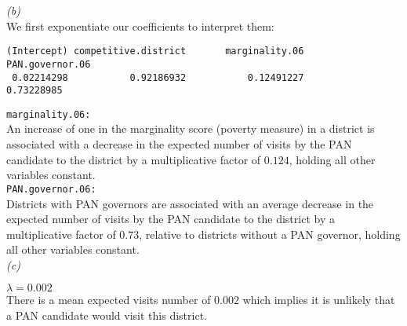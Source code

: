 \documentclass[12pt,letterpaper]{article}
\begin{document}
\newpage
\noindent\textit{(b)}\\
\noindent We first exponentiate our coefficients to interpret them:

\begin{BVerbatim}
(Intercept) competitive.district       marginality.06      PAN.governor.06
 0.02214298           0.92186932           0.12491227           0.73228985 
\end{BVerbatim}

\vspace{0.75cm}
\noindent \texttt{marginality.06:}\\
\noindent An increase of one in the marginality score (poverty measure) in a district is associated with a decrease in the expected number of visits by the PAN candidate to the district by a multiplicative factor of $0.124$, holding all other variables constant.\\

\noindent \texttt{PAN.governor.06:}\\
\noindent Districts with PAN governors are associated with an average decrease in the expected number of visits by the PAN candidate to the district by a multiplicative factor of $0.73$, relative to districts without a PAN governor, holding all other variables constant.\\

\noindent\textit{(c)}

$\lambda = 0.002$\\
\noindent There is a mean expected visits number of $0.002$ which implies it is unlikely that a PAN candidate would visit this district.
\end{document}

